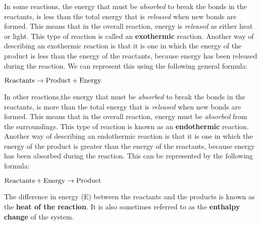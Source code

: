 In some reactions, the energy that must be \textit{absorbed} to break the bonds in the reactants, is less than
the total energy that is \textit{released} when new bonds are formed. This means that in the overall reaction, energy is \textit{released} as either heat or light. This type of reaction is called an \textbf{exothermic} reaction. Another way of describing an exothermic reaction is that it is one in which the energy of the product is less than the energy of the reactants, because energy has been released during the reaction. We can represent this using the following general formula:

\begin{center}
$\rm{Reactants \rightarrow Product + Energy}$
\end{center}

In other reactions,the energy that must be \textit{absorbed} to break the bonds in the reactants, is more than
the total energy that is \textit{released} when new bonds are formed. This means that in the overall reaction, energy must be \textit{absorbed} from the surroundings. This type of reaction is known as an \textbf{endothermic} reaction. Another way of describing an endothermic reaction is that it is one in which the energy of the product is greater than the energy of the reactants, because energy has been absorbed during the reaction. This can be represented by the following formula:

\begin{center}
$\rm{Reactants + Energy \rightarrow Product}$
\end{center}

The difference in energy (E) between the reactants and the products is known as the \textbf{heat of the reaction}. It is also sometimes referred to as the \textbf{enthalpy change} of the system.

